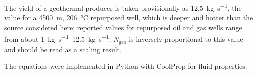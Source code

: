 The yield of a geothermal producer is taken provisionally as
\SI{12.5}{\kilo\gram\per\second}, the value for a \SI{4500}{\meter},
\SI{206}{\celsius} repurposed well, which is deeper and hotter than the source
considered here; reported values for repurposed oil and gas wells range from
about \SIrange{1}{12.5}{\kilo\gram\per\second}. $N_\mathrm{geo}$ is inversely
proportional to this value and should be read as a scaling result.

The equations were implemented in Python with CoolProp \cite{CoolProp} for
fluid properties. 
